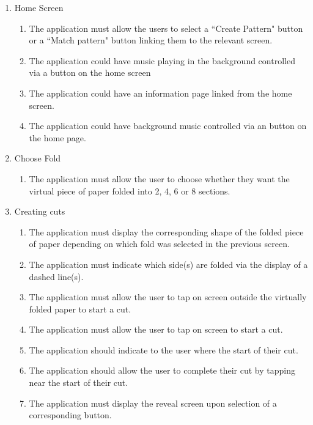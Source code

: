 \documentclass[11pt]{article}
\begin{document}
    \begin{enumerate}
      \item Home Screen
        \begin{enumerate}[label*=\arabic*.]
        \item The application must allow the users to select a ``Create Pattern" button or a ``Match pattern" button linking them to the relevant screen.
        \item The application could have music playing in the background controlled via a button on the home screen
        \item The application could have an information page linked from the home screen.
        \item The application could have background music controlled via an button on the home page.
      \end{enumerate}
      
       \item Choose Fold
        \begin{enumerate}[label*=\arabic*.]
        \item The application must allow the user to choose whether they want the virtual piece of paper folded into 2, 4, 6 or 8 sections.
      \end{enumerate}
      
      \item Creating cuts
      \begin{enumerate}[label*=\arabic*.]
        \item The application must display the corresponding shape of the folded piece of paper depending on which fold was selected in the previous screen.
        \item The application must indicate which side(s) are folded via the display of a dashed line(s).
        \item The application must allow the user to tap on screen outside the virtually folded paper to start a cut. 
        \item The application must allow the user to tap on screen to start a cut.
        \item The application should indicate to the user where the start of their cut.
        \item The application should allow the user to complete their cut by tapping near the start of their cut. 
        \item The application must display the reveal screen upon selection of a corresponding button.  
      \end{enumerate}
      

\end{enumerate}
\end{document}
